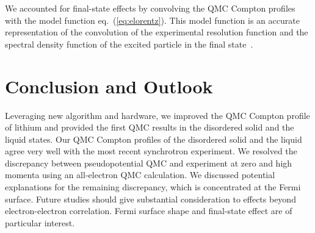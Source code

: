 \documentclass[aps,prb,showpacs,preprintnumbers,amsmath,amssymb,superscriptaddress,twocolumn]{revtex4-1}
\begin{document}
We accounted for final-state effects by convolving the QMC Compton profiles with the model function eq.~(\ref{eq:elorentz}). This model function is an accurate representation of the convolution of the experimental resolution function and the spectral density function of the excited particle in the final state~\cite{Soininen2001}.




\section{Conclusion and Outlook}

Leveraging new algorithm and hardware, we improved the QMC Compton profile of lithium and provided the first QMC results in the disordered solid and the liquid states. Our QMC Compton profiles of the disordered solid and the liquid agree very well with the most recent synchrotron experiment. We resolved the discrepancy between pseudopotential QMC and experiment at zero and high momenta using an all-electron QMC calculation. We discussed potential explanations for the remaining discrepancy, which is concentrated at the Fermi surface. Future studies should give substantial consideration to effects beyond electron-electron correlation. Fermi surface shape and final-state effect are of particular interest.%
\end{document}
